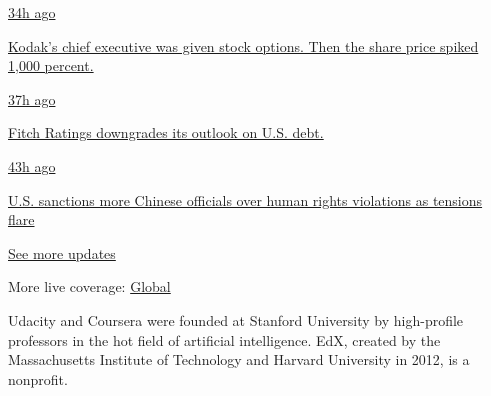 \href{https://www.nytimes.com/live/2020/07/31/business/stock-market-today-coronavirus?action=click\&pgtype=Article\&state=default\&region=MAIN_CONTENT_1\&context=storylines_live_updates\#kodaks-chief-executive-was-given-stock-options-then-the-share-price-spiked-1000-percent}{34h
ago}

\href{https://www.nytimes.com/live/2020/07/31/business/stock-market-today-coronavirus?action=click\&pgtype=Article\&state=default\&region=MAIN_CONTENT_1\&context=storylines_live_updates\#kodaks-chief-executive-was-given-stock-options-then-the-share-price-spiked-1000-percent}{Kodak's
chief executive was given stock options. Then the share price spiked
1,000 percent.}

\href{https://www.nytimes.com/live/2020/07/31/business/stock-market-today-coronavirus?action=click\&pgtype=Article\&state=default\&region=MAIN_CONTENT_1\&context=storylines_live_updates\#fitch-ratings-downgrades-its-outlook-on-us-debt}{37h
ago}

\href{https://www.nytimes.com/live/2020/07/31/business/stock-market-today-coronavirus?action=click\&pgtype=Article\&state=default\&region=MAIN_CONTENT_1\&context=storylines_live_updates\#fitch-ratings-downgrades-its-outlook-on-us-debt}{Fitch
Ratings downgrades its outlook on U.S. debt.}

\href{https://www.nytimes.com/live/2020/07/31/business/stock-market-today-coronavirus?action=click\&pgtype=Article\&state=default\&region=MAIN_CONTENT_1\&context=storylines_live_updates\#us-sanctions-more-chinese-officials-over-human-rights-violations-as-tensions-flare}{43h
ago}

\href{https://www.nytimes.com/live/2020/07/31/business/stock-market-today-coronavirus?action=click\&pgtype=Article\&state=default\&region=MAIN_CONTENT_1\&context=storylines_live_updates\#us-sanctions-more-chinese-officials-over-human-rights-violations-as-tensions-flare}{U.S.
sanctions more Chinese officials over human rights violations as
tensions flare}

\href{https://www.nytimes.com/live/2020/07/31/business/stock-market-today-coronavirus?action=click\&pgtype=Article\&state=default\&region=MAIN_CONTENT_1\&context=storylines_live_updates}{See
more updates}

More live coverage:
\href{https://www.nytimes.com/2020/08/01/world/coronavirus-covid-19.html?action=click\&pgtype=Article\&state=default\&region=MAIN_CONTENT_1\&context=storylines_live_updates}{Global}

Udacity and Coursera were founded at Stanford University by high-profile
professors in the hot field of artificial intelligence. EdX, created by
the Massachusetts Institute of Technology and Harvard University in
2012, is a nonprofit.


